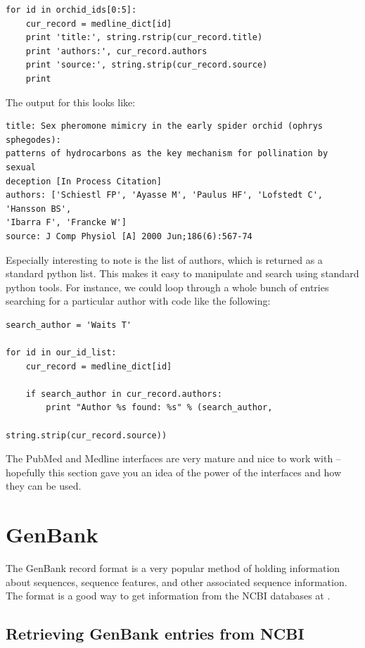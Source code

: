 \documentclass{report}
\begin{document}
\begin{verbatim}
for id in orchid_ids[0:5]:
    cur_record = medline_dict[id]
    print 'title:', string.rstrip(cur_record.title)
    print 'authors:', cur_record.authors
    print 'source:', string.strip(cur_record.source)
    print
\end{verbatim}

The output for this looks like:

\begin{verbatim}
title: Sex pheromone mimicry in the early spider orchid (ophrys sphegodes):
patterns of hydrocarbons as the key mechanism for pollination by sexual
deception [In Process Citation]
authors: ['Schiestl FP', 'Ayasse M', 'Paulus HF', 'Lofstedt C', 'Hansson BS', 
'Ibarra F', 'Francke W']
source: J Comp Physiol [A] 2000 Jun;186(6):567-74
\end{verbatim}

Especially interesting to note is the list of authors, which is returned as a standard python list. This makes it easy to manipulate and search using standard python tools. For instance, we could loop through a whole bunch of entries searching for a particular author with code like the following:

\begin{verbatim}
search_author = 'Waits T'

for id in our_id_list:
    cur_record = medline_dict[id]
    
    if search_author in cur_record.authors:
        print "Author %s found: %s" % (search_author,
                                       string.strip(cur_record.source))
\end{verbatim} 

The PubMed and Medline interfaces are very mature and nice to work with -- hopefully this section gave you an idea of the power of the interfaces and how they can be used.

\section{GenBank}

The GenBank record format is a very popular method of holding information about sequences, sequence features, and other associated sequence information. The format is a good way to get information from the NCBI databases at . 

\subsection{Retrieving GenBank entries from NCBI}
\end{document}

